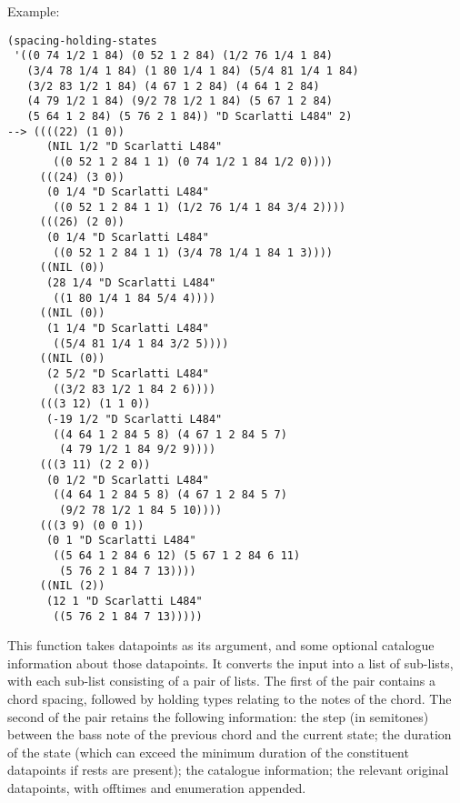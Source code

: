 \vspace{0.5cm}
\noindent Example:
\begin{verbatim}
(spacing-holding-states
 '((0 74 1/2 1 84) (0 52 1 2 84) (1/2 76 1/4 1 84)
   (3/4 78 1/4 1 84) (1 80 1/4 1 84) (5/4 81 1/4 1 84)
   (3/2 83 1/2 1 84) (4 67 1 2 84) (4 64 1 2 84)
   (4 79 1/2 1 84) (9/2 78 1/2 1 84) (5 67 1 2 84)
   (5 64 1 2 84) (5 76 2 1 84)) "D Scarlatti L484" 2)
--> ((((22) (1 0))
      (NIL 1/2 "D Scarlatti L484"
       ((0 52 1 2 84 1 1) (0 74 1/2 1 84 1/2 0))))
     (((24) (3 0))
      (0 1/4 "D Scarlatti L484"
       ((0 52 1 2 84 1 1) (1/2 76 1/4 1 84 3/4 2))))
     (((26) (2 0))
      (0 1/4 "D Scarlatti L484"
       ((0 52 1 2 84 1 1) (3/4 78 1/4 1 84 1 3))))
     ((NIL (0))
      (28 1/4 "D Scarlatti L484"
       ((1 80 1/4 1 84 5/4 4))))
     ((NIL (0))
      (1 1/4 "D Scarlatti L484"
       ((5/4 81 1/4 1 84 3/2 5))))
     ((NIL (0))
      (2 5/2 "D Scarlatti L484"
       ((3/2 83 1/2 1 84 2 6))))
     (((3 12) (1 1 0))
      (-19 1/2 "D Scarlatti L484"
       ((4 64 1 2 84 5 8) (4 67 1 2 84 5 7)
        (4 79 1/2 1 84 9/2 9))))
     (((3 11) (2 2 0))
      (0 1/2 "D Scarlatti L484"
       ((4 64 1 2 84 5 8) (4 67 1 2 84 5 7)
        (9/2 78 1/2 1 84 5 10))))
     (((3 9) (0 0 1))
      (0 1 "D Scarlatti L484"
       ((5 64 1 2 84 6 12) (5 67 1 2 84 6 11)
        (5 76 2 1 84 7 13))))
     ((NIL (2))
      (12 1 "D Scarlatti L484"
       ((5 76 2 1 84 7 13)))))
\end{verbatim}

\noindent This function takes datapoints as its
argument, and some optional catalogue information
about those datapoints. It converts the input into a
list of sub-lists, with each sub-list consisting of a
pair of lists. The first of the pair contains a chord
spacing, followed by holding types relating to the
notes of the chord. The second of the pair retains the
following information: the step (in semitones) between
the bass note of the previous chord and the current
state; the duration of the state (which can exceed the
minimum duration of the constituent datapoints if
rests are present); the catalogue information; the
relevant original datapoints, with offtimes and
enumeration appended.






























